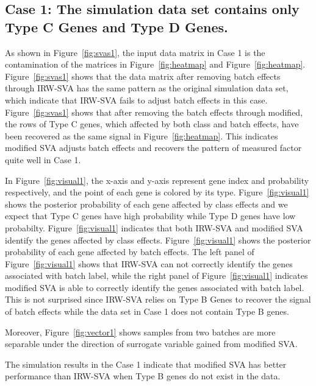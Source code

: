\documentclass[11pt]{article}
\begin{document}
\subsection{Case 1: The simulation data set contains only Type C Genes and Type D Genes.}

As shown in Figure~\ref{fig:svas1}, the input data matrix in Case 1 is the contamination of the matrices in Figure~\ref{fig:heatmap} and Figure~\ref{fig:heatmap}. Figure~\ref{fig:svas1} shows that the data matrix after removing batch effects through IRW-SVA has the same pattern as the original simulation data set, which indicate that IRW-SVA fails to adjust batch effects in this case. Figure~\ref{fig:svas1} shows that after removing the batch effects through modified, the rows of Type C genes, which affected by both class and batch effects, have been recovered as the same signal in Figure~\ref{fig:heatmap}. This indicates modified SVA adjusts batch effects and recovers the pattern of measured factor quite well in Case 1. 

In Figure~\ref{fig:visual1}, the x-axis and y-axis represent gene index and probability respectively, and the point of each gene is colored by its type. Figure~\ref{fig:visual1} shows the posterior probability of each gene affected by class effects and we expect that Type C genes have high probability while Type D genes have low probabilty. Figure~\ref{fig:visual1} indicates that both IRW-SVA and modified SVA identify the genes affected by class effects.
Figure~\ref{fig:visual1} shows the posterior probability of each gene affected by batch effects. The left panel of Figure~\ref{fig:visual1} shows that IRW-SVA can not correctly identify the genes associated with batch label, while the right panel of Figure~\ref{fig:visual1} indicates modified SVA is able to correctly identify the genes associated with batch label. This is not surprised since IRW-SVA relies on Type B Genes to recover the signal of batch effects while the data set in Case 1 does not contain Type B genes.

Moreover, Figure~\ref{fig:vector1} shows samples from two batches are more separable under the direction of surrogate variable gained from modified SVA. 

The simulation results in the Case 1 indicate that modified SVA has better performance than IRW-SVA when Type B genes do not exist in the data.
\end{document}
